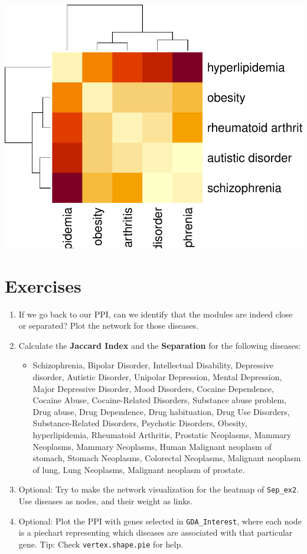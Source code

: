 \documentclass[
]{book}
\providecommand{\tightlist}{%
  \setlength{\itemsep}{0pt}\setlength{\parskip}{0pt}}
\begin{document}
\includegraphics{NetMed_files/figure-latex/unnamed-chunk-29-1.pdf}

\hypertarget{exercises-4}{%
\section{Exercises}\label{exercises-4}}

\begin{enumerate}
\def\labelenumi{\arabic{enumi}.}
\item
  If we go back to our PPI, can we identify that the modules are indeed close or separated? Plot the network for those diseases.
\item
  Calculate the \textbf{Jaccard Index} and the \textbf{Separation} for the following diseases:

  \begin{itemize}
  \tightlist
  \item
    Schizophrenia, Bipolar Disorder, Intellectual Disability, Depressive disorder, Autistic Disorder, Unipolar Depression, Mental Depression, Major Depressive Disorder, Mood Disorders, Cocaine Dependence, Cocaine Abuse, Cocaine-Related Disorders, Substance abuse problem, Drug abuse, Drug Dependence, Drug habituation, Drug Use Disorders, Substance-Related Disorders, Psychotic Disorders, Obesity, hyperlipidemia, Rheumatoid Arthritis, Prostatic Neoplasms, Mammary Neoplasms, Mammary Neoplasms, Human Malignant neoplasm of stomach, Stomach Neoplasms, Colorectal Neoplasms, Malignant neoplasm of lung, Lung Neoplasms, Malignant neoplasm of prostate.
  \end{itemize}
\item
  Optional: Try to make the network visualization for the heatmap of \texttt{Sep\_ex2}. Use diseases as nodes, and their weight as links.
\item
  Optional: Plot the PPI with genes selected in \texttt{GDA\_Interest}, where each node is a piechart representing which diseases are associated with that particular gene. Tip: Check \texttt{vertex.shape.pie} for help.
\end{enumerate}
\end{document}
